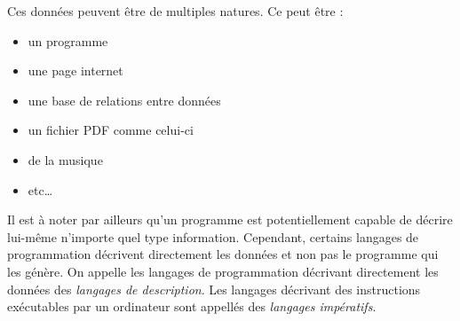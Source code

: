 \documentclass[../../main.tex]{subfiles}
\begin{document}
Ces données peuvent être de multiples natures. Ce peut être :
\begin{itemize}
	\item un programme
	\item une page internet
	\item une base de relations entre données
	\item un fichier PDF comme celui-ci
	\item de la musique
	\item etc\dots
\end{itemize}
Il est à noter par ailleurs qu'un programme est potentiellement capable de décrire lui-même n'importe quel type information. Cependant, certains langages de programmation décrivent directement les données et non pas le programme qui les génère. On appelle les langages de programmation décrivant directement les données des \textit{langages de description}. Les langages décrivant des instructions exécutables par un ordinateur sont appellés des \textit{langages impératifs}.
\end{document}

